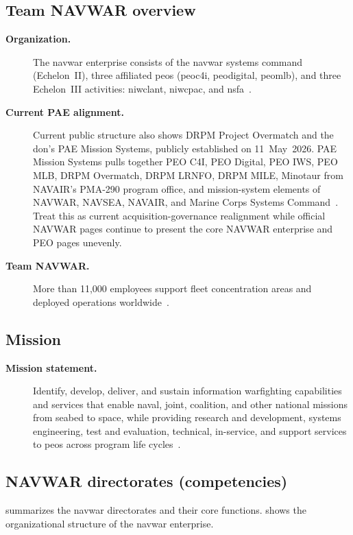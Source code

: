 \documentclass[../main.tex]{subfiles}
\begin{document}
\subsection{Team NAVWAR overview}
\begin{description}
  \item[\textbf{Organization.}] The \ac{navwar} enterprise consists of the \ac{navwar} systems command (Echelon~II), three affiliated \acp{peo} (\ac{peoc4i}, \ac{peodigital}, \ac{peomlb}), and three Echelon~III activities: \ac{niwclant}, \ac{niwcpac}, and \ac{nsfa}~\autocite{edo-2-1-3-navwar-enterprise-2024}.
  \item[\textbf{Current PAE alignment.}] Current public structure also shows DRPM Project Overmatch and the \ac{don}'s PAE Mission Systems, publicly established on 11~May~2026. PAE Mission Systems pulls together PEO C4I, PEO Digital, PEO IWS, PEO MLB, DRPM Overmatch, DRPM LRNFO, DRPM MILE, Minotaur from NAVAIR's PMA-290 program office, and mission-system elements of NAVWAR, NAVSEA, NAVAIR, and Marine Corps Systems Command~\autocite{DON-PAE-Expansion-May2026,DON-PAE-Mission-Systems-2026}. Treat this as current acquisition-governance realignment while official NAVWAR pages continue to present the core NAVWAR enterprise and PEO pages unevenly.
  \item[\textbf{Team NAVWAR.}] More than 11{,}000 employees support fleet concentration areas and deployed operations worldwide~\autocite{edo-2-1-3-navwar-enterprise-2024}.
\end{description}

\subsection{Mission}
\begin{description}
  \item[\textbf{Mission statement.}] Identify, develop, deliver, and sustain information warfighting capabilities and services that enable naval, joint, coalition, and other national missions from seabed to space, while providing research and development, systems engineering, test and evaluation, technical, in-service, and support services to \acp{peo} across program life cycles~\autocite{edo-2-1-3-navwar-enterprise-2024}.
\end{description}

\subsection{NAVWAR directorates (competencies)}
\Tab{\ref{tab:navwar-directorates}} summarizes the \ac{navwar} directorates and their core functions. \Fig{\ref{fig:navwar-org-chart}} shows the organizational structure of the \ac{navwar} enterprise.
\end{document}
